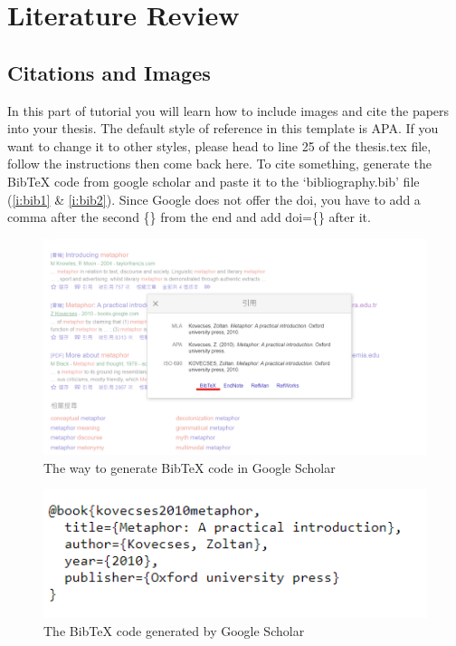 \chapter{Literature Review}
\label{c:literature}

\section{Citations and Images} %
In this part of tutorial you will learn how to include images and cite the papers into your thesis. The default style of reference in this template is APA. If you want to change it to other styles, please head to line 25 of the thesis.tex file, follow the instructions then come back here.
To cite something, generate the BibTeX code from google scholar and paste it to the `bibliography.bib' file (\autoref{i:bib1} \& \autoref{i:bib2}). Since Google does not offer the doi, you have to add a comma after the second \{\} from the end and add doi=\{\} after it.


\begin{figure}[!htbp]
\centering %
\includegraphics[width=1\textwidth]{figures/bib1.png}
\caption{The way to generate BibTeX code in Google Scholar} %
\label{i:bib1} %
\end{figure}

\begin{figure}[!htbp]
\centering %
\includegraphics[width=1\textwidth]{figures/bib2.png}
\caption{The BibTeX code generated by Google Scholar} %
\label{i:bib2}
\end{figure}


